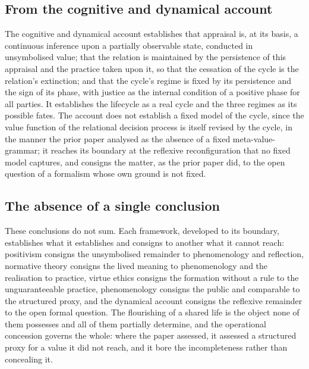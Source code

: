 \subsection{From the cognitive and dynamical account}
\label{p11:sec:concl-dynamical}

The cognitive and dynamical account establishes that appraisal is, at its basis, a continuous inference upon a partially observable state, conducted in unsymbolised value; that the relation is maintained by the persistence of this appraisal and the practice taken upon it, so that the cessation of the cycle is the relation's extinction; and that the cycle's regime is fixed by its persistence and the sign of its phase, with justice as the internal condition of a positive phase for all parties. It establishes the lifecycle as a real cycle and the three regimes as its possible fates. The account does not establish a fixed model of the cycle, since the value function of the relational decision process is itself revised by the cycle, in the manner the prior paper analysed as the absence of a fixed meta-value-grammar; it reaches its boundary at the reflexive reconfiguration that no fixed model captures, and consigns the matter, as the prior paper did, to the open question of a formalism whose own ground is not fixed.

\subsection{The absence of a single conclusion}
\label{p11:sec:concl-none}

These conclusions do not sum. Each framework, developed to its boundary, establishes what it establishes and consigns to another what it cannot reach: positivism consigns the unsymbolised remainder to phenomenology and reflection, normative theory consigns the lived meaning to phenomenology and the realisation to practice, virtue ethics consigns the formation without a rule to the unguaranteeable practice, phenomenology consigns the public and comparable to the structured proxy, and the dynamical account consigns the reflexive remainder to the open formal question. The flourishing of a shared life is the object none of them possesses and all of them partially determine, and the operational concession governs the whole: where the paper assessed, it assessed a structured proxy for a value it did not reach, and it bore the incompleteness rather than concealing it.

